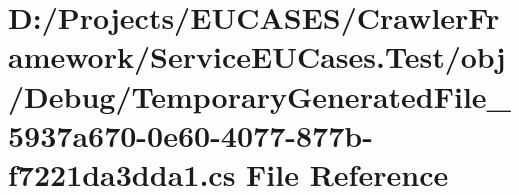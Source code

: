 \hypertarget{_service_e_u_cases_8_test_2obj_2_debug_2_temporary_generated_file__5937a670-0e60-4077-877b-f7221da3dda1_8cs}{\section{D\-:/\-Projects/\-E\-U\-C\-A\-S\-E\-S/\-Crawler\-Framework/\-Service\-E\-U\-Cases.Test/obj/\-Debug/\-Temporary\-Generated\-File\-\_\-5937a670-\/0e60-\/4077-\/877b-\/f7221da3dda1.cs File Reference}
\label{_service_e_u_cases_8_test_2obj_2_debug_2_temporary_generated_file__5937a670-0e60-4077-877b-f7221da3dda1_8cs}
}
